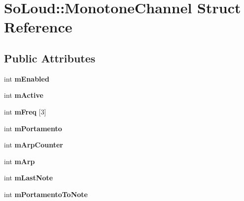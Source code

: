 \hypertarget{struct_so_loud_1_1_monotone_channel}{}\section{So\+Loud\+::Monotone\+Channel Struct Reference}
\label{struct_so_loud_1_1_monotone_channel}
\subsection*{Public Attributes}
\begin{DoxyCompactItemize}
\item 
\mbox{\label{struct_so_loud_1_1_monotone_channel_a602555f7e6902a92b02cfe919c7429fc}} 
int {\bfseries m\+Enabled}
\item 
\mbox{\label{struct_so_loud_1_1_monotone_channel_a6be325ad129edc512a8844927d5fdcd9}} 
int {\bfseries m\+Active}
\item 
\mbox{\label{struct_so_loud_1_1_monotone_channel_acce03d2e79a05ea63be8f30051aebecd}} 
int {\bfseries m\+Freq} \mbox{[}3\mbox{]}
\item 
\mbox{\label{struct_so_loud_1_1_monotone_channel_a21a22b01af45aeac2897e1f98bbfb6ac}} 
int {\bfseries m\+Portamento}
\item 
\mbox{\label{struct_so_loud_1_1_monotone_channel_a6663c37a5a349c11af0f1c1b82172ee2}} 
int {\bfseries m\+Arp\+Counter}
\item 
\mbox{\label{struct_so_loud_1_1_monotone_channel_aae4e6376ce89d269496f046851b12bc8}} 
int {\bfseries m\+Arp}
\item 
\mbox{\label{struct_so_loud_1_1_monotone_channel_aecc61199b4a97561b44e1c70c0f45b7a}} 
int {\bfseries m\+Last\+Note}
\item 
\mbox{\label{struct_so_loud_1_1_monotone_channel_a3b224d2b41bfaa83737824c3fb932164}} 
int {\bfseries m\+Portamento\+To\+Note}

\end{DoxyCompactItemize}
